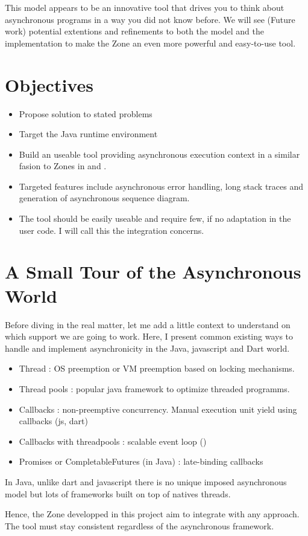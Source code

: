 This model appears to be an innovative tool that drives you to think about asynchronous programs in a way you did not know before. We will see (Future work) potential extentions and refinements to both the model and the implementation to make the Zone an even more powerful and easy-to-use tool.

\section{Objectives}

\begin{itemize}
\item Propose solution to stated problems
\item Target the Java runtime environment
\item Build an useable tool providing asynchronous execution context in a similar fasion to Zones in \zonejs and \zonedrt.
\item Targeted features include asynchronous error handling, long stack traces and generation of asynchronous sequence diagram.
\item The tool should be easily useable and require few, if no adaptation in the user code. I will call this the integration concerns.
\end{itemize}

\section{A Small Tour of the Asynchronous World}

Before diving in the real matter, let me add a little context to understand on which support we are going to work. Here, I present common existing ways to handle and implement asynchronicity in the Java, javascript and Dart world.
\begin{itemize}
\item Thread : OS preemption or VM preemption based on locking mechanisms.
\item Thread pools : popular java framework to optimize threaded programms.
\item Callbacks : non-preemptive concurrency. Manual execution unit yield using callbacks (js, dart)
\item Callbacks with threadpools : scalable event loop (\vertx)
\item Promises or CompletableFutures (in Java) : late-binding callbacks
\end{itemize}

In Java, unlike dart and javascript there is no unique imposed asynchronous model but lots of frameworks built on top of natives threads.

Hence, the Zone developped in this project aim to integrate with any approach. The tool must stay consistent regardless of the asynchronous framework.